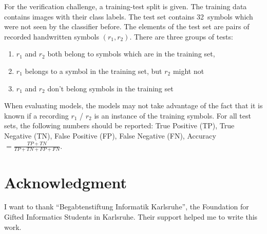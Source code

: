 For the verification challenge, a training-test split is given. The training
data contains images with their class labels. The test set
contains 32~symbols which were not seen by the classifier before. The elements
of the test set are pairs of recorded handwritten symbols $(r_1, r_2)$. There
are three groups of tests:
\begin{enumerate}[label=V\arabic*]
    \item $r_1$ and $r_2$ both belong to symbols which are in the training set,
    \item $r_1$ belongs to a symbol in the training set, but $r_2$
          might not
    \item $r_1$ and $r_2$ don't belong symbols in the training set
\end{enumerate}

When evaluating models, the models may not take advantage of the fact that it
is known if a recording $r_1$ / $r_2$ is an instance of the training symbols.
For all test sets, the following numbers should be reported: True Positive (TP),
True Negative (TN), False Positive (FP), False Negative (FN),
Accuracy $= \frac{TP+ TN}{TP+TN+FP+FN}$.






\section{Acknowledgment}

I want to thank \enquote{Begabtenstiftung Informatik Karls\-ruhe}, the Foundation
for Gifted Informatics Students in Karlsruhe. Their support helped me to write
this work.
